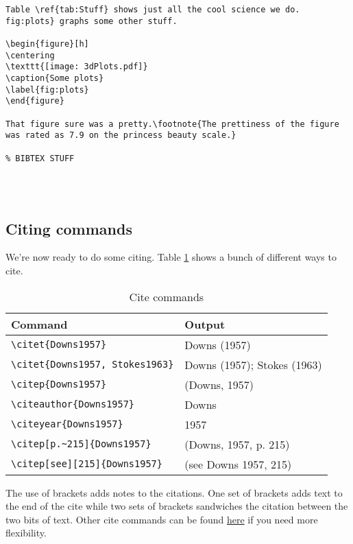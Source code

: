 \begin{lstlisting}
Table \ref{tab:Stuff} shows just all the cool science we do. fig:plots} graphs some other stuff.

\begin{figure}[h]
\centering
\texttt{[image: 3dPlots.pdf]}
\caption{Some plots}
\label{fig:plots}
\end{figure}

That figure sure was a pretty.\footnote{The prettiness of the figure was rated as 7.9 on the princess beauty scale.}

% BIBTEX STUFF




\end{lstlisting}

\newpage
\subsection*{Citing commands}

We're now ready to do some citing. Table \ref{tab:Citations} shows a bunch of different ways to cite.

\begin{table}[h]
	\centering
	\caption{Cite commands}
	\label{tab:Citations}
\begin{small}
  \begin{center}
    \begin{tabular}{ll}
	Command & Output \\ \hline
	\verb|\citet{Downs1957}| & Downs (1957) \\
	\verb|\citet{Downs1957, Stokes1963}| & Downs (1957); Stokes (1963) \\
	\verb|\citep{Downs1957}| & (Downs, 1957) \\
	\verb|\citeauthor{Downs1957}| & Downs \\
	\verb|\citeyear{Downs1957}| & 1957 \\
	\verb|\citep[p.~215]{Downs1957}|	 & (Downs, 1957, p. 215) \\ 
	\verb|\citep[see][215]{Downs1957}| & (see Downs 1957, 215) \\ \hline
	
    \end{tabular}
  \end{center}
\end{small}
\end{table}

The use of brackets adds notes to the citations. One set of brackets adds text to the end of the cite while two sets of brackets sandwiches the citation between the two bits of text. Other cite commands can be found \href{http://merkel.zoneo.net/Latex/natbib.php}{here} if you need more flexibility.

